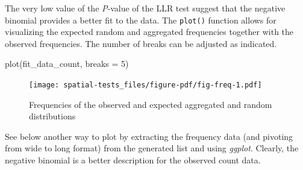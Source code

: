 \documentclass[
  letterpaper,
]{book}
\newenvironment{Shaded}{\begin{snugshade}}{\end{snugshade}}
\newcommand{\AttributeTok}[1]{\textcolor[rgb]{0.40,0.45,0.13}{#1}}
\newcommand{\DecValTok}[1]{\textcolor[rgb]{0.68,0.00,0.00}{#1}}
\newcommand{\FunctionTok}[1]{\textcolor[rgb]{0.28,0.35,0.67}{#1}}
\newcommand{\NormalTok}[1]{\textcolor[rgb]{0.00,0.23,0.31}{#1}}
\newcommand{\OtherTok}[1]{\textcolor[rgb]{0.00,0.23,0.31}{#1}}
\newcommand{\SpecialCharTok}[1]{\textcolor[rgb]{0.37,0.37,0.37}{#1}}
\newcommand{\StringTok}[1]{\textcolor[rgb]{0.13,0.47,0.30}{#1}}
\begin{document}
The very low value of the \emph{P}-value of the LLR test suggest that
the negative binomial provides a better fit to the data. The
\texttt{plot()} function allows for visualizing the expected random and
aggregated frequencies together with the observed frequencies. The
number of breaks can be adjusted as indicated.

\begin{Shaded}
\begin{Highlighting}[]
\FunctionTok{plot}\NormalTok{(fit\_data\_count, }\AttributeTok{breaks =} \DecValTok{5}\NormalTok{) }
\end{Highlighting}
\end{Shaded}

\begin{figure}[H]

\texttt{[image: spatial-tests\_files/figure-pdf/fig-freq-1.pdf]} \hfill{}

\caption{\label{fig-freq}Frequencies of the observed and expected
aggregated and random distributions}

\end{figure}

See below another way to plot by extracting the frequency data (and
pivoting from wide to long format) from the generated list and using
\emph{ggplot}. Clearly, the negative binomial is a better description
for the observed count data.

\begin{Shaded}
\end{Shaded}
\end{document}
